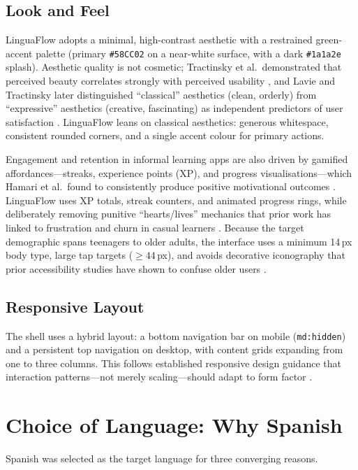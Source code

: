 \documentclass[11pt,a4paper]{article}
\begin{document}
\subsection{Look and Feel}
LinguaFlow adopts a minimal, high-contrast aesthetic with a restrained green-accent palette (primary \texttt{\#58CC02} on a near-white surface, with a dark \texttt{\#1a1a2e} splash). Aesthetic quality is not cosmetic; Tractinsky et al.\ demonstrated that perceived beauty correlates strongly with perceived usability \cite{tractinsky2000beautiful}, and Lavie and Tractinsky later distinguished ``classical'' aesthetics (clean, orderly) from ``expressive'' aesthetics (creative, fascinating) as independent predictors of user satisfaction \cite{lavie2004assessing}. LinguaFlow leans on classical aesthetics: generous whitespace, consistent rounded corners, and a single accent colour for primary actions.

Engagement and retention in informal learning apps are also driven by gamified affordances—streaks, experience points (XP), and progress visualisations—which Hamari et al.\ found to consistently produce positive motivational outcomes \cite{hamari2014does}. LinguaFlow uses XP totals, streak counters, and animated progress rings, while deliberately removing punitive ``hearts/lives'' mechanics that prior work has linked to frustration and churn in casual learners \cite{shortt2023gamification}. Because the target demographic spans teenagers to older adults, the interface uses a minimum 14\,px body type, large tap targets ($\geq 44$\,px), and avoids decorative iconography that prior accessibility studies have shown to confuse older users \cite{nielsen1994usability}.

\subsection{Responsive Layout}
The shell uses a hybrid layout: a bottom navigation bar on mobile (\texttt{md:hidden}) and a persistent top navigation on desktop, with content grids expanding from one to three columns. This follows established responsive design guidance that interaction patterns—not merely scaling—should adapt to form factor \cite{marcotte2011responsive}.

\section{Choice of Language: Why Spanish}
Spanish was selected as the target language for three converging reasons.
\end{document}
